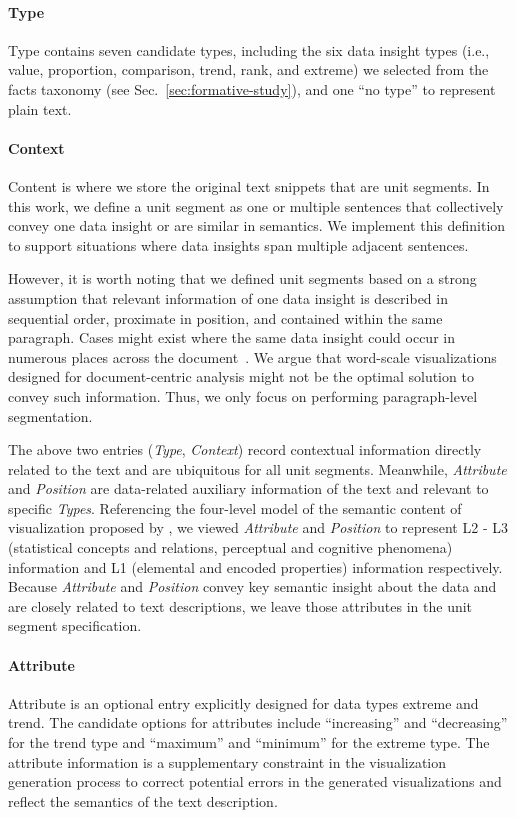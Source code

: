 \paragraph{Type}
Type contains seven candidate types, including the six data insight types (i.e., value, proportion, comparison, trend, rank, and extreme) we selected from the facts taxonomy (see Sec.~\ref{sec:formative-study}), and one ``no type'' to represent plain text. 

\paragraph{Context}
Content is where we store the original text snippets that are unit segments. In this work, we define a unit segment as one or multiple sentences that collectively convey one data insight or are similar in semantics. We implement this definition to support situations where data insights span multiple adjacent sentences.

However, it is worth noting that we defined unit segments based on a strong assumption that relevant information of one data insight is described in sequential order, proximate in position, and contained within the same paragraph. Cases might exist where the same data insight could occur in numerous places across the document~\cite{goffin2020Interaction}. We argue that word-scale visualizations designed for document-centric analysis might not be the optimal solution to convey such information. Thus, we only focus on performing paragraph-level segmentation.

\smallskip
The above two entries (\textit{Type}, \textit{Context}) record contextual information directly related to the text and are ubiquitous for all unit segments. Meanwhile, \textit{Attribute} and \textit{Position} are data-related auxiliary information of the text and relevant to specific \textit{Types}. Referencing the four-level model of the semantic content of visualization proposed by \citet{lundgard2022accessible}, we viewed \textit{Attribute} and \textit{Position} to represent L2 - L3 (statistical concepts and relations, perceptual and cognitive phenomena) information and L1 (elemental and encoded properties) information respectively. Because \textit{Attribute} and \textit{Position} convey key semantic insight about the data and are closely related to text descriptions, we leave those attributes in the unit segment specification.

\paragraph{Attribute}
Attribute is an optional entry explicitly designed for data types extreme and trend. The candidate options for attributes include ``increasing'' and ``decreasing'' for the trend type and ``maximum'' and ``minimum'' for the extreme type. The attribute information is a supplementary constraint in the visualization generation process to correct potential errors in the generated visualizations and reflect the semantics of the text description.

